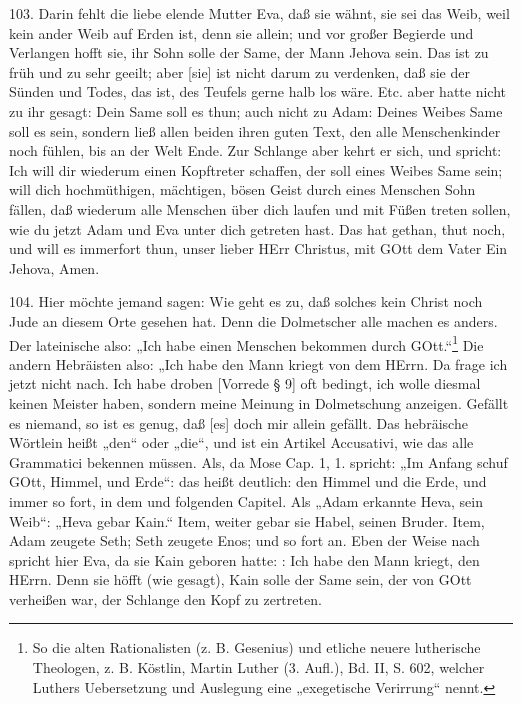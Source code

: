 103. Darin fehlt die liebe elende Mutter Eva, daß sie wähnt, sie sei das Weib, weil kein ander Weib auf Erden ist, denn sie allein; und vor großer Begierde und Verlangen hofft sie, ihr Sohn solle der Same, der Mann Jehova sein. Das ist zu früh und zu sehr geeilt; aber [sie] ist nicht darum zu verdenken, daß sie der Sünden und Todes, das ist, des Teufels gerne halb los wäre. Etc. aber hatte nicht zu ihr gesagt: Dein Same soll es thun; auch nicht zu Adam: Deines Weibes Same soll es sein, sondern ließ allen beiden ihren guten Text, den alle Menschenkinder noch fühlen, bis an der Welt Ende. Zur Schlange aber kehrt er sich, und spricht: Ich will dir wiederum einen Kopftreter schaffen, der soll eines Weibes Same sein; will dich hochmüthigen, mächtigen, bösen Geist durch eines Menschen Sohn fällen, daß wiederum alle Menschen über dich laufen und mit Füßen treten sollen, wie du jetzt Adam und Eva unter dich getreten hast. Das hat gethan, thut noch, und will es immerfort thun, unser lieber HErr Christus, mit GOtt dem Vater Ein Jehova, Amen.

104. Hier möchte jemand sagen: Wie geht es zu, daß solches kein Christ noch Jude an diesem Orte gesehen hat. Denn die Dolmetscher alle machen es anders. Der lateinische also: „Ich habe einen Menschen bekommen durch GOtt.“\footnote{So die alten Rationalisten (z. B. Gesenius) und etliche neuere lutherische Theologen, z. B. Köstlin, Martin Luther (3. Aufl.), Bd. II, S. 602, welcher Luthers Uebersetzung und Auslegung eine „exegetische Verirrung“ nennt.} Die andern Hebräisten also: „Ich habe den Mann kriegt von dem HErrn. Da frage ich jetzt nicht nach. Ich habe droben [Vorrede § 9] oft bedingt, ich wolle diesmal keinen Meister haben, sondern meine Meinung in Dolmetschung anzeigen. Gefällt es niemand, so ist es genug, daß [es] doch mir allein gefällt. Das hebräische Wörtlein  heißt „den“ oder „die“, und ist ein Artikel Accusativi, wie das alle Grammatici bekennen müssen. Als, da Mose Cap. 1, 1. spricht: „Im Anfang schuf GOtt,  Himmel, und  Erde“: das heißt deutlich: den Himmel und die Erde, und immer so fort, in dem und folgenden Capitel. Als „Adam erkannte  Heva, sein Weib“: „Heva gebar  Kain.“ Item, weiter gebar sie  Habel, seinen Bruder. Item, Adam zeugete  Seth; Seth zeugete  Enos; und so fort an. Eben der Weise nach spricht hier Eva, da sie Kain geboren hatte: : Ich habe den Mann kriegt, den HErrn. Denn sie höfft (wie gesagt), Kain solle der Same sein, der von GOtt verheißen war, der Schlange den Kopf zu zertreten.

